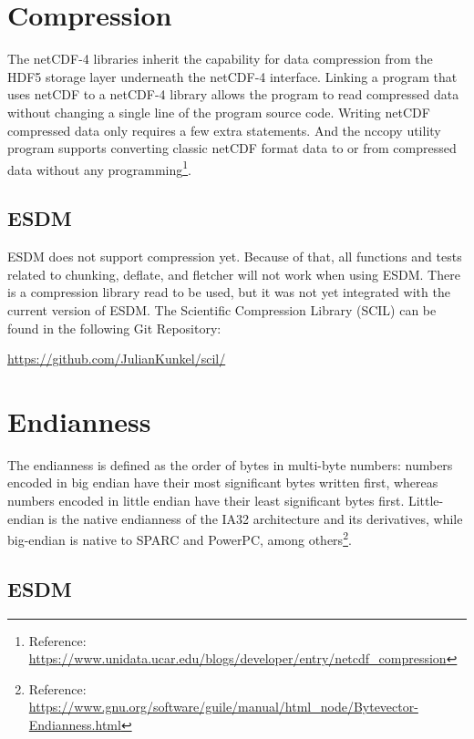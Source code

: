 \section{Compression}

The netCDF-4 libraries inherit the capability for data compression from the HDF5 storage layer underneath the netCDF-4 interface. Linking a program that uses netCDF to a netCDF-4 library allows the program to read compressed data without changing a single line of the program source code. Writing netCDF compressed data only requires a few extra statements. And the nccopy utility program supports converting classic netCDF format data to or from compressed data without any programming\footnote{Reference: \url{https://www.unidata.ucar.edu/blogs/developer/entry/netcdf_compression}}.

\subsection{ESDM}

\tab
ESDM does not support compression yet. Because of that, all functions and tests related to chunking, deflate, and fletcher will not work when using ESDM. There is a compression library read to be used, but it was not yet integrated with the current version of ESDM. The Scientific Compression Library (SCIL) can be found in the following Git Repository:

\begin{center}
\url{https://github.com/JulianKunkel/scil/}
\end{center}

\section{Endianness}

\tab
The endianness is defined as the order of bytes in multi-byte numbers: numbers encoded in big endian have their most significant bytes written first, whereas numbers encoded in little endian have their least significant bytes first. Little-endian is the native endianness of the IA32 architecture and its derivatives, while big-endian is native to SPARC and PowerPC, among others\footnote{Reference: \url{https://www.gnu.org/software/guile/manual/html_node/Bytevector-Endianness.html}}.

\subsection{ESDM}

